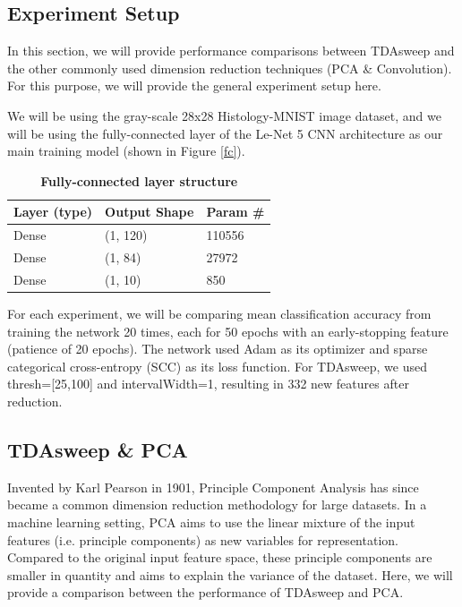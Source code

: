 \documentclass{article}
\begin{document}
\subsection{Experiment Setup}
In this section, we will provide performance comparisons between TDAsweep and the other commonly used dimension reduction techniques (PCA \& Convolution). For this purpose, we will provide the general experiment setup here.

We will be using the gray-scale 28x28 Histology-MNIST image dataset, and we will be using the fully-connected layer of the Le-Net 5 CNN architecture as our main training model (shown in Figure \ref{fc}).


\begin{table}[!ht]
\centering
\caption{{\bf Fully-connected layer structure}}
\begin{tabular}{l|l|l}
\hline
\multicolumn{1}{l|}{\bf Layer (type)} & \multicolumn{1}{|l|}{\bf Output Shape} & \multicolumn{1}{|l}{\bf Param \#}\\ \hline
Dense & (1, 120) & 110556 \\ \hline
Dense & (1, 84) & 27972  \\ \hline
Dense & (1, 10) & 850  \\ \hline

\end{tabular}
\label{tda_aug}
\end{table}



For each experiment, we will be comparing mean classification accuracy from training the network 20 times, each for 50 epochs with an early-stopping feature (patience of 20 epochs). The network used Adam as its optimizer and sparse categorical cross-entropy (SCC) as its loss function. For TDAsweep, we used thresh=[25,100] and intervalWidth=1, resulting in 332 new features after reduction.

\subsection{TDAsweep \& PCA}
Invented by Karl Pearson in 1901, Principle Component Analysis has since became a common dimension reduction methodology for large datasets. In a machine learning setting, PCA aims to use the linear mixture of the input features (i.e. principle components) as new variables for representation. Compared to the original input feature space, these principle components are smaller in quantity and aims to explain the variance of the dataset. Here, we will provide a comparison between the performance of TDAsweep and PCA.
\end{document}
